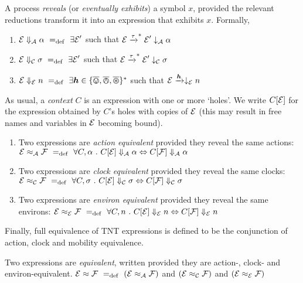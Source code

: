 \documentclass[orivec]{llncs}
\newcommand{\Exhibits}[1]{\mathrel{\downarrow_{#1}}}
\newcommand{\ExhibitsA}{\Exhibits{\mathcal{A}}}
\newcommand{\ExhibitsC}{\Exhibits{\mathcal{C}}}
\newcommand{\ExhibitsE}{\Exhibits{\mathcal{E}}}
\newcommand{\Reveals}[1]{\mathrel{\Downarrow_{#1}}}
\newcommand{\RevealsA}{\Reveals{\mathcal{A}}}
\newcommand{\RevealsC}{\Reveals{\mathcal{C}}}
\newcommand{\RevealsE}{\Reveals{\mathcal{E}}}
\newcommand{\Eq}{\approx}
\newcommand{\EqA}{\mathrel{\Eq_{\mathcal{A}}}}
\newcommand{\EqC}{\mathrel{\Eq_{\mathcal{C}}}}
\newcommand{\EqE}{\mathrel{\Eq_{\mathcal{E}}}}
\newcommand{\Means}{\mathrel{~=_{\mathrm{def}}~}}
\newcommand{\Does}[1]{\xrightarrow{#1}}
\newcommand{\DoesMany}[1]{\mathrel{{\xrightarrow{#1}}^*}}
\begin{document}
\begin{definition}
A process \emph{reveals} (or \emph{eventually exhibits}) a symbol $x$, provided the relevant reductions transform it into an expression that exhibits $x$. Formally,
\begin{enumerate}
\item
    $\expr \RevealsA \alpha
     \Means
     \exists \expr'$
     such that
    $\expr \DoesMany{\tau} \expr' \ExhibitsA \alpha$
\item
    $\expr \RevealsC \sigma
     \Means
     \exists \expr'$
     such that
    $\expr \DoesMany{\tau} \expr' \ExhibitsC \sigma$
\item
    $\expr \RevealsE n
     \Means
     \exists \vec{h} \in \{ \bin, \bout, \bopen \}^*$
     such that
    $\expr \Does{\vec{h}} \ExhibitsE n$
\end{enumerate}
\end{definition}

As usual, a \emph{context} $C$ is an expression with one or more `holes'. We write $C[\text{$\mathcal{E}$}]$ for the expression obtained by $C$'s holes with copies of $\text{$\mathcal{E}$}$ (this may result in free names and variables in $\text{$\mathcal{E}$}$ becoming bound).

\begin{definition}
\begin{enumerate}
\item
    Two expressions are \emph{action equivalent} provided they reveal the same actions: 
    $\expr \EqA \exprb
     \Means
     \forall C, \alpha ~.~
     C[\expr] \RevealsA \alpha \Leftrightarrow C[\exprb] \RevealsA \alpha$
\item
    Two expressions are \emph{clock equivalent} provided they reveal the same clocks: 
    $\expr \EqC \exprb
     \Means
     \forall C, \sigma ~.~
     C[\expr] \RevealsC \sigma \Leftrightarrow C[\exprb] \RevealsC \sigma$
\item
    Two expressions are \emph{environ equivalent} provided they reveal the same environs: 
    $\expr \EqE \exprb
     \Means
     \forall C, n ~.~
     C[\expr] \RevealsE n \Leftrightarrow C[\exprb] \RevealsE n$
\end{enumerate}
\end{definition}

Finally, full equivalence of TNT expressions is defined to be the conjunction of action, clock and mobility equivalence.
\begin{definition}
Two expressions are \emph{equivalent}, written provided they are action-, clock- and environ-equivalent.
    $\expr \Eq \exprb
     \Means
     \left( \expr \EqA \exprb \right)$
     and
     $\left( \expr \EqC \exprb \right)$
     and
     $\left( \expr \EqE \exprb \right)$
\end{definition}



\end{document}
